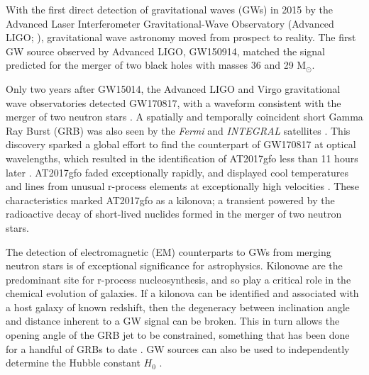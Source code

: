 \documentclass{aa}
\begin{document}
With the first direct detection of gravitational waves (GWs) in 2015 by the Advanced Laser Interferometer Gravitational-Wave
Observatory (Advanced LIGO; \citealp{FirstGW}), gravitational wave astronomy moved from prospect to reality. The first GW source observed by Advanced LIGO, GW150914, matched the signal predicted for the merger of two black holes with masses 36 and 29 M$_{\odot}$.

Only two years after GW15014, %
the Advanced LIGO and Virgo gravitational wave observatories detected GW170817, with a waveform consistent with the merger of two neutron stars \citep{GW170817}. A spatially and temporally coincident short Gamma Ray Burst (GRB) was also seen by the {\it Fermi} and {\it INTEGRAL} satellites \citep{GW170817_GRB}. This discovery sparked a global effort to find the counterpart of GW170817 at optical wavelengths, which resulted in the identification of AT2017gfo less than 11 hours later \citep{GW170817_EM}. AT2017gfo faded exceptionally rapidly, and displayed cool temperatures and lines from unusual r-process elements at exceptionally high velocities \citep{Smar17,Arca17,Pian17,Coul17,Kilp17}. These characteristics marked AT2017gfo as a kilonova; a transient powered by the radioactive decay of short-lived nuclides formed in the merger of two neutron stars.

The detection of electromagnetic (EM) counterparts to GWs from merging neutron stars is of exceptional significance for astrophysics. Kilonovae are the predominant site for r-process nucleosynthesis, and so play a critical role in the chemical evolution of galaxies. If a kilonova can be identified and associated with a host galaxy of known redshift, then the degeneracy between inclination angle and distance inherent to a GW signal can be broken. This in turn allows the opening angle of the GRB jet to be constrained, something that has been done for a handful of GRBs to date \citep{2018ApJ...857..128J}. GW %
sources can also be used to independently determine the Hubble constant $H_0$ \citep{GWH0}.
\end{document}

